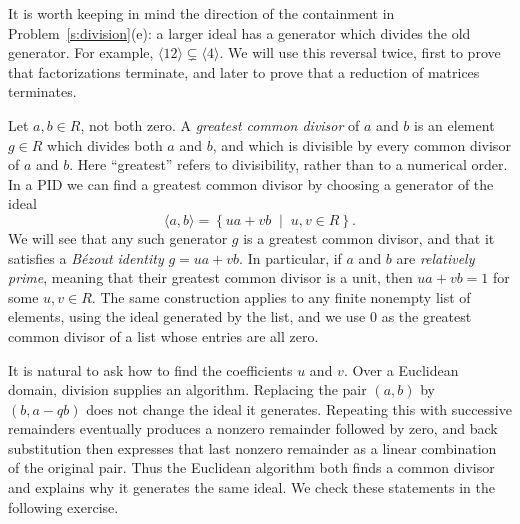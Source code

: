 \documentclass[12pt,reqno]{amsart}
\begin{document}
\hrulefill

It is worth keeping in mind the direction of the containment in Problem~\ref{s:division}(e): a larger ideal has a generator which divides the old generator. For example, $\langle12\rangle\subsetneq\langle4\rangle$. We will use this reversal twice, first to prove that factorizations terminate, and later to prove that a reduction of matrices terminates.

Let $a,b\in R$, not both zero. A \emph{greatest common divisor} of $a$ and $b$ is an element $g\in R$ which divides both $a$ and $b$, and which is divisible by every common divisor of $a$ and $b$. Here ``greatest'' refers to divisibility, rather than to a numerical order. In a PID we can find a greatest common divisor by choosing a generator of the ideal
\[
\langle a,b\rangle=\left\{ua+vb \;\; \big| \;\; u,v\in R\right\}.
\]
We will see that any such generator $g$ is a greatest common divisor, and that it satisfies a \emph{B\'ezout identity} $g=ua+vb$. In particular, if $a$ and $b$ are \emph{relatively prime}, meaning that their greatest common divisor is a unit, then $ua+vb=1$ for some $u,v\in R$. The same construction applies to any finite nonempty list of elements, using the ideal generated by the list, and we use $0$ as the greatest common divisor of a list whose entries are all zero.

It is natural to ask how to find the coefficients $u$ and $v$. Over a Euclidean domain, division supplies an algorithm. Replacing the pair $(a,b)$ by $(b,a-qb)$ does not change the ideal it generates. Repeating this with successive remainders eventually produces a nonzero remainder followed by zero, and back substitution then expresses that last nonzero remainder as a linear combination of the original pair. Thus the Euclidean algorithm both finds a common divisor and explains why it generates the same ideal. We check these statements in the following exercise.

\hrulefill
\end{document}
